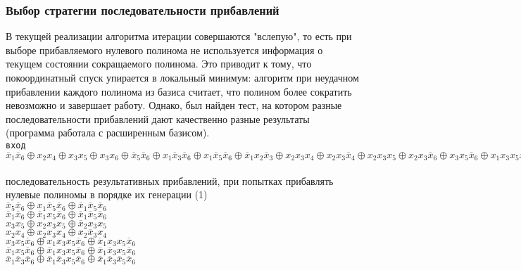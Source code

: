 \documentclass[a4paper,12pt,titlepage,finall]{article}
\begin{document}
\subsubsection{Выбор стратегии последовательности прибавлений}

В текущей реализации алгоритма итерации совершаются "вслепую", то есть при выборе прибавляемого нулевого полинома не используется информация о текущем состоянии сокращаемого полинома. Это приводит к тому, что покоординатный спуск упирается в локальный минимум: алгоритм при неудачном прибавлении каждого полинома из базиса считает, что полином более сократить невозможно и завершает работу. Однако, был найден тест, на котором разные последовательности прибавлений дают качественно разные результаты (программа работала с расширенным базисом).
~\\
\texttt{вход}\\
$ \overline x_1 \overline x_6 \oplus x_2 x_4 \oplus x_3 x_5 \oplus x_3 x_6 \oplus \overline x_5 \overline x_6 \oplus x_1 \overline x_3 \overline x_6 \oplus x_1 \overline x_5 \overline x_6 \oplus \overline x_1 x_2 \overline x_3 \oplus x_2 x_3 x_4 \oplus x_2 x_3 \overline x_4 \oplus x_2 x_3 x_5 \oplus x_2 x_3 \overline x_6 \oplus x_3 x_5 \overline x_6 \oplus x_1 x_3 x_5 \overline x_6 \oplus \overline x_1 \overline x_3 \overline x_5 \overline x_6 \oplus x_2 x_3 x_4 x_5 \oplus x_2 \overline x_3 \overline x_5 \overline x_6 \oplus x_1 \overline x_2 x_3 \overline x_4 x_5 \overline x_6 $
~\\
последовательность результативных прибавлений, при попытках прибавлять нулевые полиномы в порядке их генерации (1)\\
$ \overline x_5 \overline x_6 \oplus x_1 \overline x_5 \overline x_6 \oplus \overline x_1 \overline x_5 \overline x_6 $ \\
$ \overline x_1 \overline x_6 \oplus \overline x_1 x_5 \overline x_6 \oplus \overline x_1 \overline x_5 \overline x_6 $ \\
$ x_3 x_5 \oplus x_2 x_3 x_5 \oplus \overline x_2 x_3 x_5 $ \\
$ x_2 x_4 \oplus x_2 x_3 x_4 \oplus x_2 \overline x_3 x_4 $ \\
$ x_3 x_5 \overline x_6 \oplus x_1 x_3 x_5 \overline x_6 \oplus \overline x_1 x_3 x_5 \overline x_6 $ \\
$ \overline x_1 x_5 \overline x_6 \oplus \overline x_1 x_3 x_5 \overline x_6 \oplus \overline x_1 \overline x_3 x_5 \overline x_6 $ \\
$ \overline x_1 \overline x_3 \overline x_6 \oplus \overline x_1 \overline x_3 x_5 \overline x_6 \oplus \overline x_1 \overline x_3 \overline x_5 \overline x_6 $ \\
\end{document}
